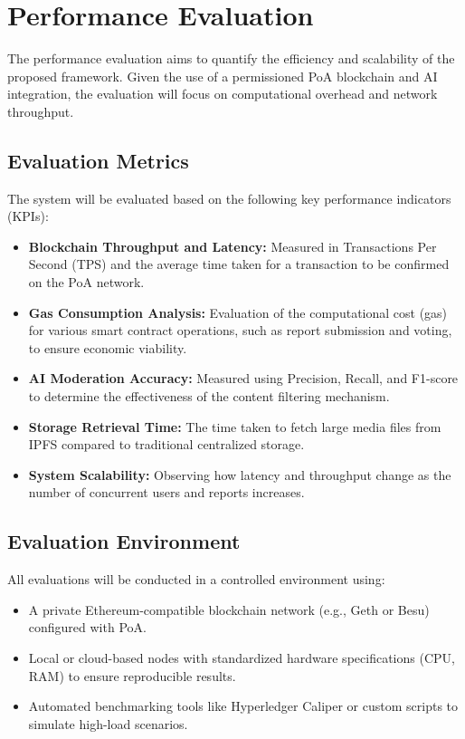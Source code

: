\section{Performance Evaluation}
\label{sec:performance_evaluation}

The performance evaluation aims to quantify the efficiency and scalability of the proposed framework. Given the use of a permissioned PoA blockchain and AI integration, the evaluation will focus on computational overhead and network throughput.

\subsection{Evaluation Metrics}
The system will be evaluated based on the following key performance indicators (KPIs):

\begin{itemize}
    \item \textbf{Blockchain Throughput and Latency:} Measured in Transactions Per Second (TPS) and the average time taken for a transaction to be confirmed on the PoA network.
    \item \textbf{Gas Consumption Analysis:} Evaluation of the computational cost (gas) for various smart contract operations, such as report submission and voting, to ensure economic viability.
    \item \textbf{AI Moderation Accuracy:} Measured using Precision, Recall, and F1-score to determine the effectiveness of the content filtering mechanism.
    \item \textbf{Storage Retrieval Time:} The time taken to fetch large media files from IPFS compared to traditional centralized storage.
    \item \textbf{System Scalability:} Observing how latency and throughput change as the number of concurrent users and reports increases.
\end{itemize}

\subsection{Evaluation Environment}
All evaluations will be conducted in a controlled environment using:
\begin{itemize}
    \item A private Ethereum-compatible blockchain network (e.g., Geth or Besu) configured with PoA.
    \item Local or cloud-based nodes with standardized hardware specifications (CPU, RAM) to ensure reproducible results.
    \item Automated benchmarking tools like Hyperledger Caliper or custom scripts to simulate high-load scenarios.
\end{itemize}
